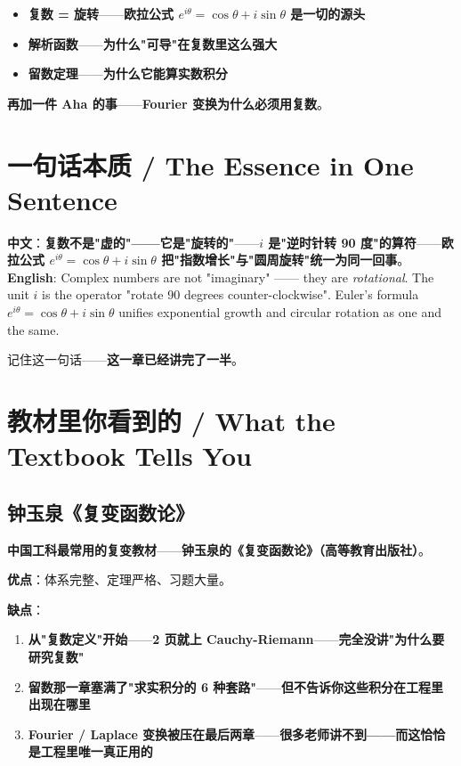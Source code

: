 \begin{itemize}
\item \textbf{复数 = 旋转}——\textbf{欧拉公式 $e^{i\theta} = \cos\theta + i\sin\theta$ 是一切的源头}
\item \textbf{解析函数}——\textbf{为什么"可导"在复数里这么强大}
\item \textbf{留数定理}——\textbf{为什么它能算实数积分}
\end{itemize}

\textbf{再加一件 Aha 的事}——\textbf{Fourier 变换为什么必须用复数}。

\section{一句话本质 / The Essence in One Sentence}

\begin{tcolorbox}[essbox={一句话本质}]
\textbf{中文}：\textbf{复数不是"虚的"——它是"旋转的"}——\textbf{$i$ 是"逆时针转 90 度"的算符}——\textbf{欧拉公式 $e^{i\theta} = \cos\theta + i\sin\theta$ 把"指数增长"与"圆周旋转"统一为同一回事}。\\[6pt]
\textbf{English}: Complex numbers are not "imaginary" —— they are \emph{rotational}. The unit $i$ is the operator "rotate 90 degrees counter-clockwise". Euler's formula $e^{i\theta} = \cos\theta + i\sin\theta$ unifies exponential growth and circular rotation as one and the same.
\end{tcolorbox}

记住这一句话——\textbf{这一章已经讲完了一半}。

\section{教材里你看到的 / What the Textbook Tells You}

\subsection{钟玉泉《复变函数论》}

\textbf{中国工科最常用的复变教材}——\textbf{钟玉泉的《复变函数论》（高等教育出版社）}。

\textbf{优点}：体系完整、定理严格、习题大量。

\textbf{缺点}：

\begin{enumerate}
\item \textbf{从"复数定义"开始}——\textbf{2 页就上 Cauchy-Riemann}——\textbf{完全没讲"为什么要研究复数"}
\item \textbf{留数那一章塞满了"求实积分的 6 种套路"}——\textbf{但不告诉你这些积分在工程里出现在哪里}
\item \textbf{Fourier / Laplace 变换被压在最后两章}——\textbf{很多老师讲不到——而这恰恰是工程里唯一真正用的}
\end{enumerate}

